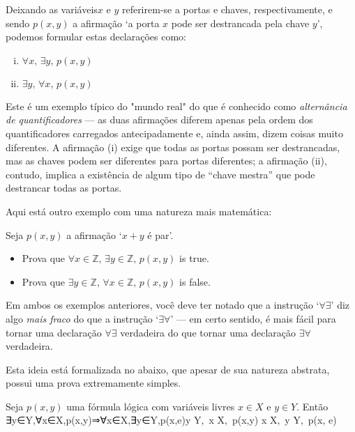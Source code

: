 Deixando as variáveis ​​$x$ e $y$ referirem-se a portas e chaves, respectivamente, e sendo $p(x,y)$ a afirmação `a porta $x$ pode ser destrancada pela chave $y$', podemos formular estas declarações como:
\begin{enumerate}[(i)] 
\item $\forall x,\, \exists y,\, p(x,y)$
\item $\exists y,\, \forall x,\, p(x,y)$
\end{enumerate}

Este é um exemplo típico do "mundo real" do que é conhecido como \textit{alternância de quantificadores} --- as duas afirmações diferem apenas pela ordem dos quantificadores carregados antecipadamente e, ainda assim, dizem coisas muito diferentes. A afirmação (i) exige que todas as portas possam ser destrancadas, mas as chaves podem ser diferentes para portas diferentes; a afirmação (ii), contudo, implica a existência de algum tipo de “chave mestra” que pode destrancar todas as portas.

Aqui está outro exemplo com uma natureza mais matemática:

\begin{exercise}
Seja $p(x,y)$ a afirmação `$x + y$ é par'.
\begin{itemize}
\item Prova que $\forall x \in \mathbb{Z},\, \exists y \in \mathbb{Z},\, p(x,y)$ is true.
\item Prova que $\exists y \in \mathbb{Z},\, \forall x \in \mathbb{Z},\, p(x,y)$ is false.
\end{itemize}
\end{exercise}

Em ambos os exemplos anteriores, você deve ter notado que a instrução `$\forall\exists$' diz algo \textit{mais fraco} do que a instrução `$\exists\forall$' --- em certo sentido, é mais fácil para tornar uma declaração $\forall\exists$ verdadeira do que tornar uma declaração $\exists\forall$ verdadeira.

Esta ideia está formalizada no  abaixo, que apesar de sua natureza abstrata, possui uma prova extremamente simples.

\begin{theorem}
\label{thmQuantifierAlternation}
Seja $p(x,y)$ uma fórmula lógica com variáveis ​​livres $x \in X$ e $y \in Y$. Então
∃y∈Y,∀x∈X,p(x,y)⇒∀x∈X,∃y∈Y,p(x,e)\exists y \in Y,\, \forall x \in X,\, p(x,y) \Rightarrow \forall x \in X,\, \exists y \in Y,\, p(x, e)
\end{theorem}

